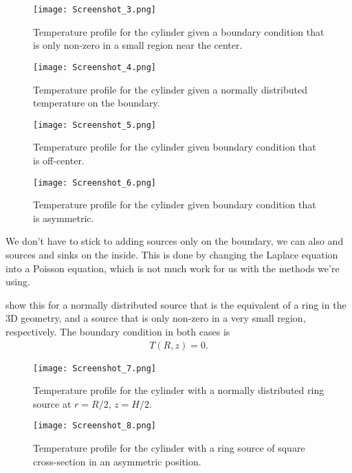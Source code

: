 \documentclass[10pt,a4paper,twocolumn]{article}
\begin{document}
\begin{figure}[!h]
    \centering
    \texttt{[image: Screenshot\_3.png]}
    \caption{Temperature profile for the cylinder given a boundary condition that is only non-zero in a small region near the center.}
    \label{fig:temp_prof_smallsrc}
\end{figure}

\begin{figure}[!h]
    \centering
    \texttt{[image: Screenshot\_4.png]}
    \caption{Temperature profile for the cylinder given a normally distributed temperature on the boundary.}
    \label{fig:temp_prof_normalsrc}
\end{figure}


\begin{figure}[!h]
    \centering
    \texttt{[image: Screenshot\_5.png]}
    \caption{Temperature profile for the cylinder given boundary condition that is off-center.}
    \label{fig:temp_prof_offcenter}
\end{figure}

\begin{figure}[!h]
    \centering
    \texttt{[image: Screenshot\_6.png]}
    \caption{Temperature profile for the cylinder given boundary condition that is asymmetric.}
    \label{fig:temp_prof_asym}
\end{figure}

\clearpage
\newpage

We don't have to stick to adding sources only on the boundary, we can also and sources and sinks on the inside. This is done by changing the Laplace equation into a Poisson equation, which is not much work for us with the methods we're using.

 show this for a normally distributed source that is the equivalent of a ring in the 3D geometry, and a source that is only non-zero in a very small region, respectively. The boundary condition in both cases is
%
\begin{align}
    T(R,z) = 0.
\end{align}

\begin{figure}[!b]
    \centering
    \texttt{[image: Screenshot\_7.png]}
    \caption{Temperature profile for the cylinder with a normally distributed ring source at $r=R/2$, $z=H/2$.}
    \label{fig:temp_prof_normal_src}
\end{figure}

\begin{figure}[!b]
    \centering
    \texttt{[image: Screenshot\_8.png]}
    \caption{Temperature profile for the cylinder with a ring source of square cross-section in an asymmetric position.}
    \label{fig:temp_prof_delta_src}
\end{figure}
\end{document}
